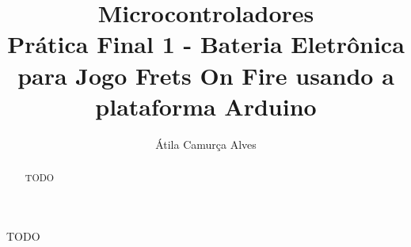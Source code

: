 \documentclass[a4paper,12pt]{article}
\title{Microcontroladores\\Prática Final 1 - Bateria Eletrônica para Jogo Frets On Fire usando a plataforma Arduino}
\author{Átila Camurça Alves}
\begin{document}
\maketitle

\begin{abstract}
  TODO
\end{abstract}
     
\begin{resumo}
  TODO
\end{resumo}


\end{document}
